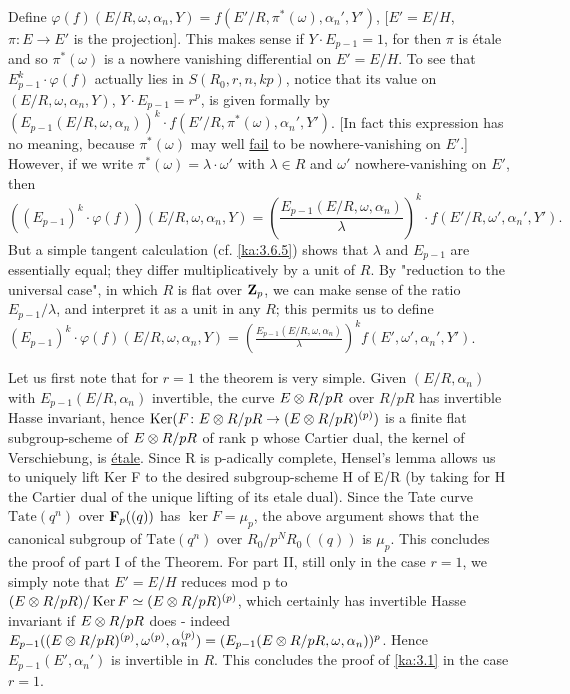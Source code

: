 \begin{kaproof}
Define $\varphi(f)(E/R,\omega,\alpha_n,Y) = f(E'/R,\pi^*(\omega),\alpha_n',Y')$,
[$E'=E/H$, $\pi\colon E\to E'$ is the projection]. This makes sense if
$Y\cdot E_{p-1}=1$, for then $\pi$ is \'etale and so $\pi^*(\omega)$ is a
nowhere vanishing differential on $E'=E/H$. To see that
$E_{p-1}^k\cdot\varphi(f)$ actually lies in $S(R_0,r,n,kp)$, notice that its
value on $(E/R,\omega,\alpha_n,Y)$, $Y\cdot E_{p-1}=r^p$, is given formally by
$(E_{p-1}(E/R,\omega,\alpha_n))^k\cdot f(E'/R,\pi^*(\omega),\alpha_n',Y')$. [In
fact this expression has no meaning, because $\pi^*(\omega)$ may well
\uline{fail} to be nowhere-vanishing on $E'$.] However, if we write
$\pi^*(\omega)=\lambda\cdot\omega'$ with $\lambda\in R$ and $\omega'$
nowhere-vanishing on $E'$, then
\[
((E_{p-1})^k\cdot\varphi(f))(E/R,\omega,\alpha_n,Y) =
\left(\frac{E_{p-1}(E/R,\omega,\alpha_n)}{\lambda}\right)^k\cdot
f(E'/R,\omega',\alpha_n',Y').
\]
But a simple tangent calculation (cf. \eqref{ka:3.6.5}) shows that $\lambda$ and
$E_{p-1}$ are essentially equal; they differ multiplicatively by a unit of $R$.
By "reduction to the universal case", in which $R$ is flat over $\mathbf{Z}_p$, we can
make sense of the ratio $E_{p-1}/\lambda$, and interpret it as a unit in any
$R$; this permits us to define
$(E_{p-1})^k\cdot\varphi(f)(E/R,\omega,\alpha_n,Y) =
\left(\frac{E_{p-1}(E/R,\omega,\alpha_n)}{\lambda}\right)^k
f(E',\omega',\alpha_n',Y')$.
\end{kaproof}


Let us first note that for $r=1$ the theorem is very simple. Given
$(E/R,\alpha_n)$ with $E_{p-1}(E/R,\alpha_n)$ invertible, the curve
$E\otimes R/pR$ over $R/pR$ has invertible Hasse invariant, hence
$\operatorname{Ker}(F\colon E\otimes R/pR\to(E\otimes R/pR)^{(p)})$ is a finite flat
subgroup-scheme of $E\otimes R/pR$ of rank p whose Cartier dual, the kernel of
Verschiebung, is \uline{\'etale}. Since R is p-adically complete, Hensel's
lemma allows us to uniquely lift Ker F to the desired subgroup-scheme H of E/R
(by taking for H the Cartier dual of the unique lifting of its etale dual).
Since the Tate curve $\mathrm{Tate}(q^n)$ over $\mathbf{F}_p((q))$ has
$\ker F = \mu_p$, the above argument shows that the canonical subgroup of
$\mathrm{Tate}(q^n)$ over $R_0/p^N R_0((q))$ is $\mu_p$. This concludes the
proof of part I of the Theorem. For part II, still only in the case $r=1$, we
simply note that $E'=E/H$ reduces mod p to
$(E\otimes R/pR)/\operatorname{Ker} F \simeq (E\otimes R/pR)^{(p)}$, which certainly has
invertible Hasse invariant if $E\otimes R/pR$ does - indeed
$E_{p-1}((E\otimes R/pR)^{(p)},\omega^{(p)},\alpha_n^{(p)}) =
(E_{p-1}(E\otimes R/pR,\omega,\alpha_n))^p$. Hence $E_{p-1}(E',\alpha_n')$ is
invertible in $R$. This concludes the proof of \eqref{ka:3.1} in the case $r=1$.

